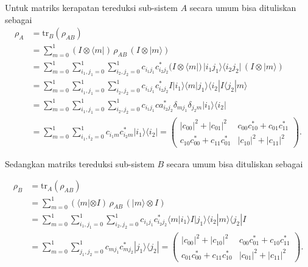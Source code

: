 \par
Untuk matriks kerapatan tereduksi sub-sistem $A$ secara umum bisa dituliskan sebagai
\begin{align}
	\rho_A &= \mathrm{tr}_B(\rho_{AB}) \nonumber \\
	&= \sum_{m=0}^{1} (I \otimes \langle m|)\, \rho_{AB}\, (I \otimes |m\rangle) \nonumber \\
	&= \sum_{m=0}^{1} \sum_{i_1,j_1=0}^{1} \sum_{i_2,j_2=0}^{1}
	c_{i_1 j_1}c^{*}_{i_2 j_2}
	(I \otimes \langle m|)\, |i_1 j_1\rangle \langle i_2 j_2|\, (I \otimes |m\rangle) \nonumber \\
	&= \sum_{m=0}^{1} \sum_{i_1,j_1=0}^{1} \sum_{i_2,j_2=0}^{1}
	c_{i_1 j_1}c^{*}_{i_2 j_2}
	I |i_1\rangle \langle m|j_1\rangle \langle i_2| I \langle j_2|m\rangle \nonumber \\
	&= \sum_{m=0}^{1} \sum_{i_1,j_1=0}^{1} \sum_{i_2,j_2=0}^{1}
	c_{i_1 j_1}ca^{*}_{i_2 j_2}
	\delta_{m j_1}\delta_{j_2 m} |i_1\rangle \langle i_2| \nonumber \\
	&= \sum_{m=0}^{1} \sum_{i_1,i_2=0}^{1}
	c_{i_1 m}c^{*}_{i_2 m}
	|i_1\rangle \langle i_2| =
	\begin{pmatrix}
		|c_{00}|^{2}+|c_{01}|^{2}
		&
		c_{00}c_{10}^{*}
		+c_{01}c_{11}^{*}
		\\[0.3cm]
		c_{10}c_{00}^{*}
		+c_{11}c_{01}^{*}
		&
		|c_{10}|^{2}+|c_{11}|^{2}
	\end{pmatrix}.
\end{align}

Sedangkan matriks tereduksi sub-sistem $B$ secara umum bisa dituliskan sebagai

\begin{align}
	\rho_B &= \mathrm{tr}_A(\rho_{AB}) \nonumber \\
	&= \sum_{m=0}^{1} (\langle m| \otimes I)\, \rho_{AB}\, (|m\rangle \otimes I) \nonumber \\
	&= \sum_{m=0}^{1} \sum_{i_1,j_1=0}^{1} \sum_{i_2,j_2=0}^{1}
	c_{i_1 j_1}c^{*}_{i_2 j_2}
	\langle m|i_1\rangle I |j_1\rangle \langle i_2|m\rangle \langle j_2| I \nonumber \\
	&= \sum_{m=0}^{1} \sum_{j_1,j_2=0}^{1}
	c_{m j_1}c^{*}_{m j_2}
	|j_1\rangle \langle j_2| =
	\begin{pmatrix}
		|c_{00}|^{2}+|c_{10}|^{2}
		&
		c_{00}c_{01}^{*}
		+c_{10}c_{11}^{*}
		\\[0.3cm]
		c_{01}c_{00}^{*}
		+c_{11}c_{10}^{*}
		&
		|c_{01}|^{2}+|c_{11}|^{2}
	\end{pmatrix}.
\end{align}

